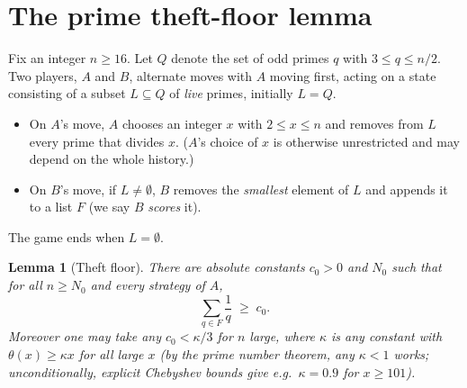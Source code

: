 \documentclass{article}
\newtheorem{lemma}{Lemma}
\begin{document}
\section*{The prime theft-floor lemma}

Fix an integer $n \ge 16$. Let $Q$ denote the set of odd primes $q$ with
$3 \le q \le n/2$. Two players, $A$ and $B$, alternate moves with $A$
moving first, acting on a state consisting of a subset $L \subseteq Q$ of
\emph{live} primes, initially $L = Q$.

\begin{itemize}
\item On $A$'s move, $A$ chooses an integer $x$ with $2 \le x \le n$ and
removes from $L$ every prime that divides $x$. ($A$'s choice of $x$ is
otherwise unrestricted and may depend on the whole history.)
\item On $B$'s move, if $L \ne \emptyset$, $B$ removes the \emph{smallest}
element of $L$ and appends it to a list $F$ (we say $B$ \emph{scores} it).
\end{itemize}
The game ends when $L = \emptyset$.

\begin{lemma}[Theft floor]
There are absolute constants $c_0 > 0$ and $N_0$ such that for all
$n \ge N_0$ and every strategy of $A$,
\[
\sum_{q \in F} \frac{1}{q} \;\ge\; c_0 .
\]
Moreover one may take any $c_0 < \kappa/3$ for $n$ large, where $\kappa$
is any constant with $\theta(x) \ge \kappa x$ for all large $x$ (by the
prime number theorem, any $\kappa < 1$ works; unconditionally, explicit
Chebyshev bounds give e.g.\ $\kappa = 0.9$ for $x \ge 101$).
\end{lemma}
\end{document}
